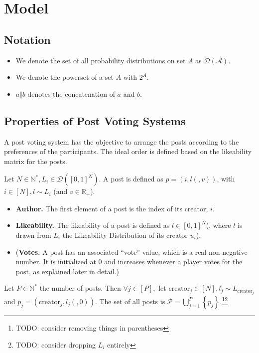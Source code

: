 \section{Model}
  \subsection{Notation}
    \begin{itemize}
      \item We denote the set of all probability distributions on set $A$ as
      $\mathcal{D\left(A\right)}$.
      \item We denote the powerset of a set $A$ with $2^A$.
      \item $a \Vert b$ denotes the concatenation of $a$ and $b$.
    \end{itemize}

  \subsection{Properties of Post Voting Systems}
    A post voting system has the objective to arrange the posts according to the
    preferences of the participants. The ideal order is defined based on the
    likeability matrix for the posts.

    \begin{definition}[Post]
      Let $N \in \mathbb{N}^*, L_i \in \mathcal{D}\left(\left[0,
      1\right]^N\right)$. A post is defined as $p = \left(i, l(, v)\right)$,
      with $i \in \left[N\right], l \sim L_i$ (and $v \in \mathbb{R}_{+}$).
      \begin{itemize}
        \item \textbf{Author.} The first element of a post is the index of its
        creator, $i$.

        \item \textbf{Likeability.} The likeability of a post is defined as $l
        \in \left[0, 1\right]^N$(, where $l$ is drawn from $L_i$ the Likeability
        Distribution of its creator $u_i$).

        \item (\textbf{Votes.} A post has an associated ``vote'' value, which is a
        real non-negative number. It is initialized at 0 and increases whenever a
        player votes for the post, as explained later in detail.)
      \end{itemize}
      Let $P \in \mathbb{N}^*$ the number of posts. Then $\forall j \in
      \left[P\right],$ let $\mathrm{creator}_j \in \left[N\right], l_j \sim
      L_{\mathrm{creator}_j}$ and $p_j = \left(\mathrm{creator}_j, l_j(,
      0)\right)$. The set of all posts is $\mathcal{P} = \bigcup\limits_{j=1}^P
      \left\{p_j\right\}$.\footnote{TODO: consider removing things in
      parentheses}\fnmsep\footnote{TODO: consider dropping $L_i$ entirely}
    \end{definition}


